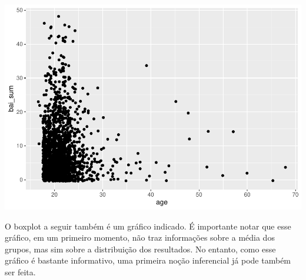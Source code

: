 \documentclass[
]{book}
\newenvironment{Shaded}{\begin{snugshade}}{\end{snugshade}}
\newcommand{\DataTypeTok}[1]{\textcolor[rgb]{0.13,0.29,0.53}{#1}}
\newcommand{\FloatTok}[1]{\textcolor[rgb]{0.00,0.00,0.81}{#1}}
\newcommand{\KeywordTok}[1]{\textcolor[rgb]{0.13,0.29,0.53}{\textbf{#1}}}
\newcommand{\NormalTok}[1]{#1}
\newcommand{\OperatorTok}[1]{\textcolor[rgb]{0.81,0.36,0.00}{\textbf{#1}}}
\newcommand{\StringTok}[1]{\textcolor[rgb]{0.31,0.60,0.02}{#1}}
\begin{document}
\begin{Shaded}
\end{Shaded}

\begin{center}\includegraphics{gitbook-demo_files/figure-latex/unnamed-chunk-23-1} \end{center}

O boxplot a seguir também é um gráfico indicado. É importante notar que esse gráfico, em um primeiro momento, não traz informações sobre a média dos grupos, mas sim sobre a distribuição dos resultados. No entanto, como esse gráfico é bastante informativo, uma primeira noção inferencial já pode também ser feita.

\begin{Shaded}
\end{Shaded}
\end{document}
